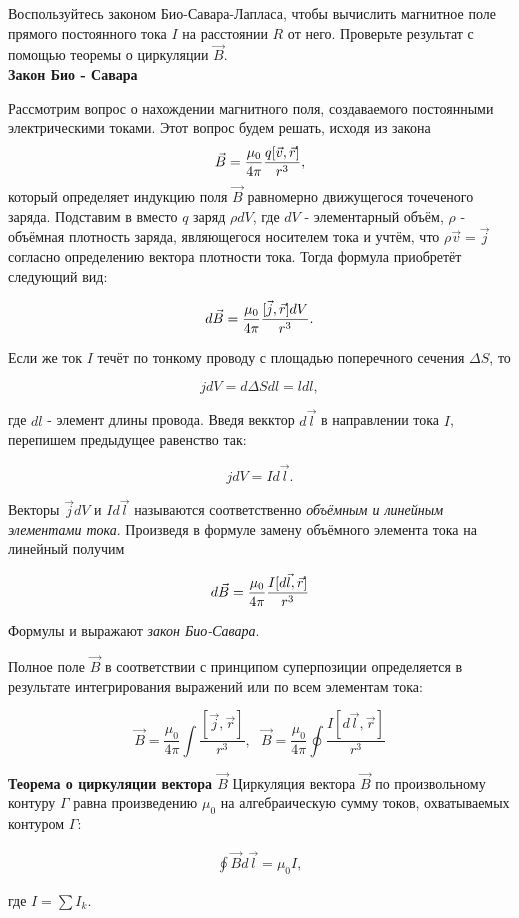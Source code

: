 \documentclass[__main__.tex]{subfiles}
\begin{document}
Воспользуйтесь законом Био-Савара-Лапласа, чтобы вычислить магнитное поле прямого постоянного тока $I$ на расстоянии $R$ от него. Проверьте результат с помощью теоремы о циркуляции $\vec{B}$.\\ 

\textbf{Закон Био - Савара}

	Рассмотрим вопрос о нахождении магнитного поля, создаваемого постоянными электрическими токами. Этот вопрос будем решать, исходя из закона 
	\begin{gather}
	\llabel{1}
	\vec{B} = \frac{\mu_0}{4\pi} \frac{q[\vec{v},\vec{r}]}{r^3},
	\end{gather}
	который определяет индукцию поля $\vec{B}$ равномерно  движущегося точеченого заряда. Подставим в  вместо $q$ заряд $\rho dV$, где $dV$ - элементарный объём, $\rho$ - объёмная плотность заряда, являющегося носителем тока и учтём, что $\rho \vec{v} = \vec{j}$ согласно определению вектора плотности тока. Тогда формула  приобретёт следующий вид:
	
	\begin{gather}
	\llabel{2}
	d\vec{B}= \frac{\mu_0}{4\pi} \frac{[\vec{j},\vec{r}] dV}{r^3}.
	\end{gather}
	
	Если же ток $I$ течёт по тонкому проводу с площадью поперечного сечения $\Delta S$, то 
	
	$$j dV = d \Delta S dl = l dl,$$
	
	где $dl$ - элемент длины провода. Введя векктор $d\vec{l}$ в направлении тока $I$, перепишем предыдущее равенство так:
	
	$$j dV = I d\vec{l}.$$
	
	Векторы $\vec{j} dV$ и $I d\vec{l}$ называются соответственно \textit{объёмным и линейным элементами тока}. Произведя в формуле  замену объёмного элемента тока на линейный получим
	
	\begin{gather}
	\llabel{3}
		d\vec{B} = \frac{\mu_0}{4\pi} \frac{I[d\vec{l},\vec{r}]}{r^3}
	\end{gather}
	
	Формулы  и  выражают \textit{закон Био-Савара}.
	
	Полное поле $\vec{B}$ в соответствии с принципом суперпозиции определяется в результате интегрирования выражений  или  по всем элементам тока:
	
	$$\vec{B} = \frac{\mu_0}{4\pi} \int \frac{[\vec{j},\vec{r}]}{r^3}, \ \ \ \vec{B} = \frac{\mu_0}{4\pi}\oint \frac{I[d\vec{l},\vec{r}]}{r^3} $$
	
	\textbf{Теорема о циркуляции вектора $\vec{B}$}
	Циркуляция вектора $\vec{B}$ по произвольному контуру $\Gamma$ равна произведению $\mu_0$ на алгебраическую сумму токов, охватываемых контуром $\Gamma$:
	
	\begin{gather}
	\oint \vec{B} d\vec{l} = \mu_0 I,
	\end{gather}
	
	где $I = \sum I_k$.
\end{document}
